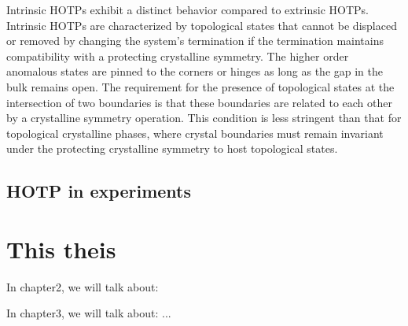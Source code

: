 Intrinsic HOTPs exhibit a distinct behavior compared to extrinsic HOTPs. Intrinsic HOTPs are characterized by topological states that cannot be displaced or removed by changing the system's termination if the termination maintains compatibility with a protecting crystalline symmetry. The higher order anomalous states are pinned to the corners or hinges as long as the gap in the bulk remains open. The requirement for the presence of topological states at the intersection of two boundaries is that these boundaries are related to each other by a crystalline symmetry operation. This condition is less stringent than that for topological crystalline phases, where crystal boundaries must remain invariant under the protecting crystalline symmetry to host topological states. \cite{trifunovic2019higher}

\subsection{HOTP in experiments}
\section{This theis}
In chapter2, we will talk about:

In chapter3, we will talk about:
...

